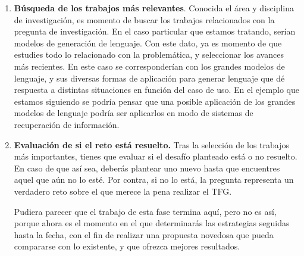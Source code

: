 \begin{enumerate}
    \item \textbf{Búsqueda de los trabajos más relevantes}. Conocida el área y disciplina de investigación, es momento de buscar los trabajos relacionados con la pregunta de investigación. En el caso particular que estamos tratando, serían modelos de generación de lenguaje. Con este dato, ya es momento de que estudies todo lo relacionado con la problemática, y seleccionar los avances más recientes. En este caso se corresponderían con los grandes modelos de lenguaje, y sus diversas formas de aplicación para generar lenguaje que dé respuesta a distintas situaciones en función del caso de uso. En el ejemplo que estamos siguiendo se podría pensar que una posible aplicación de los grandes modelos de lenguaje podría ser aplicarlos en modo de sistemas de recuperación de información.

    \item \textbf{Evaluación de si el reto está resuelto\textnormal{.}} Tras la selección de los trabajos más importantes, tienes que evaluar si el desafío planteado está o no resuelto. En caso de que así sea, deberás plantear uno nuevo hasta que encuentres aquel que aún no lo esté. Por contra, si no lo está, la pregunta representa un verdadero reto sobre el que merece la pena realizar el TFG.
    
    Pudiera parecer que el trabajo de esta fase termina aquí, pero no es así, porque ahora es el momento en el que determinarás las estrategias seguidas hasta la fecha, con el fin de realizar una propuesta novedosa que pueda compararse con lo existente, y que ofrezca mejores resultados.
\end{enumerate}

